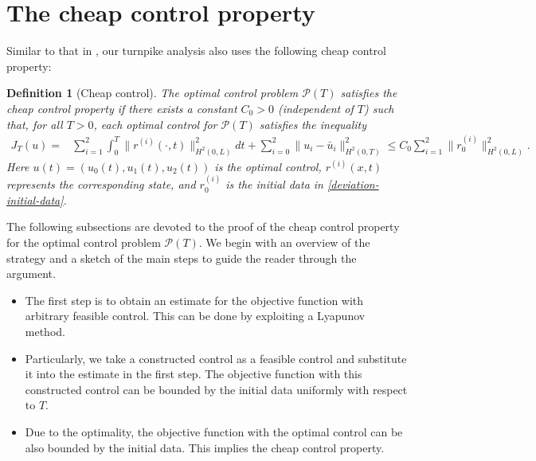 \documentclass[12pt]{article}
\newtheorem{definition}{Definition}[section]%
\numberwithin{equation}{section}
\begin{document}
\section{The cheap control property}\label{section:3}
Similar to that in \cite{gugat2024turnpike}, 
our turnpike analysis also uses the following 
cheap control property:
\begin{definition}[Cheap control]
    The optimal control problem $\mathcal{P}(T)$ satisfies the cheap control property if there exists a constant $C_0>0$ (independent of $T$) such that, for all $T>0$, each optimal control for 
    $\mathcal{P}(T)$ satisfies the inequality 
    \begin{align}\label{cheap-control-prop}
        J_T(u)=&\sum_{i=1}^2\int_0^T \|r^{(i)}(\cdot,t) \|^2_{H^2(0,L)} dt + \sum_{i=0}^2 \|u_i-\bar{u}_i\|_{H^2(0,T)}^2
        \leq C_0 \sum_{i=1}^2 \|r^{(i)}_0\|^2_{H^2(0,L)}. 
    \end{align}
    Here $u(t)=(u_0(t),u_1(t),u_2(t))$ is the optimal control, $r^{(i)}(x,t)$ represents the corresponding state, and $r^{(i)}_0$ is the initial data in \eqref{deviation-initial-data}.
\end{definition}
The following subsections are devoted to the proof of the cheap control property for the optimal control problem $\mathcal{P}(T)$. We begin with an overview of the strategy and a sketch of the main steps to guide the reader through the argument.
\begin{itemize}
    \item[(1)] The first step is to obtain an estimate for the objective function with arbitrary feasible control. This can be done by exploiting a Lyapunov method.
    \item [(2)] Particularly, we take a constructed control as a feasible control and substitute it into the estimate in the first step. The objective function with this constructed control can be bounded by the initial data uniformly with respect to $T$. 
    \item [(3)] Due to the optimality, the objective function with the optimal control can be also bounded by the initial data. This implies the cheap control property.
\end{itemize}
\end{document}
